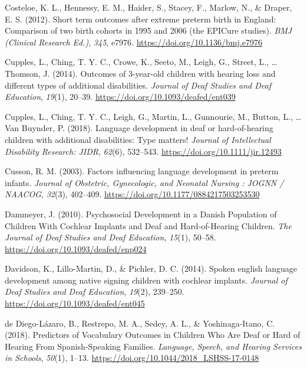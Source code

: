 \documentclass[
  english,
  man]{apa6}
\begin{document}
\leavevmode\hypertarget{ref-costeloe2012}{}%
Costeloe, K. L., Hennessy, E. M., Haider, S., Stacey, F., Marlow, N., \& Draper, E. S. (2012). Short term outcomes after extreme preterm birth in England: Comparison of two birth cohorts in 1995 and 2006 (the EPICure studies). \emph{BMJ (Clinical Research Ed.)}, \emph{345}, e7976. \url{https://doi.org/10.1136/bmj.e7976}

\leavevmode\hypertarget{ref-cupples2014}{}%
Cupples, L., Ching, T. Y. C., Crowe, K., Seeto, M., Leigh, G., Street, L., \ldots{} Thomson, J. (2014). Outcomes of 3-year-old children with hearing loss and different types of additional disabilities. \emph{Journal of Deaf Studies and Deaf Education}, \emph{19}(1), 20--39. \url{https://doi.org/10.1093/deafed/ent039}

\leavevmode\hypertarget{ref-cupples2018}{}%
Cupples, L., Ching, T. Y. C., Leigh, G., Martin, L., Gunnourie, M., Button, L., \ldots{} Van Buynder, P. (2018). Language development in deaf or hard-of-hearing children with additional disabilities: Type matters! \emph{Journal of Intellectual Disability Research: JIDR}, \emph{62}(6), 532--543. \url{https://doi.org/10.1111/jir.12493}

\leavevmode\hypertarget{ref-cusson2003}{}%
Cusson, R. M. (2003). Factors influencing language development in preterm infants. \emph{Journal of Obstetric, Gynecologic, and Neonatal Nursing : JOGNN / NAACOG}, \emph{32}(3), 402--409. \url{https://doi.org/10.1177/0884217503253530}

\leavevmode\hypertarget{ref-dammeyer2010}{}%
Dammeyer, J. (2010). Psychosocial Development in a Danish Population of Children With Cochlear Implants and Deaf and Hard-of-Hearing Children. \emph{The Journal of Deaf Studies and Deaf Education}, \emph{15}(1), 50--58. \url{https://doi.org/10.1093/deafed/enp024}

\leavevmode\hypertarget{ref-davidson2014}{}%
Davidson, K., Lillo-Martin, D., \& Pichler, D. C. (2014). Spoken english language development among native signing children with cochlear implants. \emph{Journal of Deaf Studies and Deaf Education}, \emph{19}(2), 239--250. \url{https://doi.org/10.1093/deafed/ent045}

\leavevmode\hypertarget{ref-dediego-lazaro2018}{}%
de Diego-Lázaro, B., Restrepo, M. A., Sedey, A. L., \& Yoshinaga-Itano, C. (2018). Predictors of Vocabulary Outcomes in Children Who Are Deaf or Hard of Hearing From Spanish-Speaking Families. \emph{Language, Speech, and Hearing Services in Schools}, \emph{50}(1), 1--13. \url{https://doi.org/10.1044/2018_LSHSS-17-0148}
\end{document}
